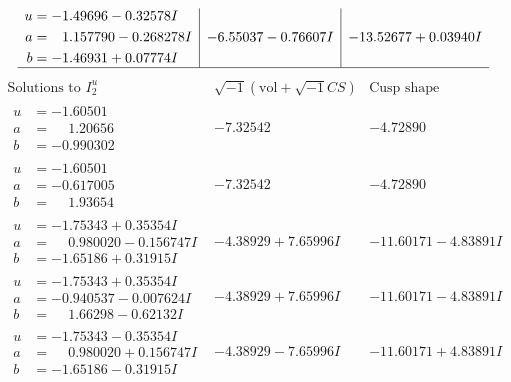 \documentclass[1p]{elsarticle_modified}
\theoremstyle{definition}
\newcommand{\I}{\sqrt{-1}}
\begin{document}
$$\begin{array}{c|c|c}
\begin{aligned}
u &= -1.49696 - 0.32578 I \\
a &= \phantom{-}1.157790 - 0.268278 I \\
b &= -1.46931 + 0.07774 I\end{aligned}
 & -6.55037 - 0.76607 I & -13.52677 + 0.03940 I\\
 \hline 
 \end{array}$$\newpage$$\begin{array}{c|c|c}  
\text{Solutions to }I^u_{2}& \I (\text{vol} + \sqrt{-1}CS) & \text{Cusp shape}\\
 \hline 
\begin{aligned}
u &= -1.60501\phantom{ +0.000000I} \\
a &= \phantom{-}1.20656\phantom{ +0.000000I} \\
b &= -0.990302\phantom{ +0.000000I}\end{aligned}
 & -7.32542\phantom{ +0.000000I} & -4.72890\phantom{ +0.000000I} \\ \hline\begin{aligned}
u &= -1.60501\phantom{ +0.000000I} \\
a &= -0.617005\phantom{ +0.000000I} \\
b &= \phantom{-}1.93654\phantom{ +0.000000I}\end{aligned}
 & -7.32542\phantom{ +0.000000I} & -4.72890\phantom{ +0.000000I} \\ \hline\begin{aligned}
u &= -1.75343 + 0.35354 I \\
a &= \phantom{-}0.980020 - 0.156747 I \\
b &= -1.65186 + 0.31915 I\end{aligned}
 & -4.38929 + 7.65996 I & -11.60171 - 4.83891 I \\ \hline\begin{aligned}
u &= -1.75343 + 0.35354 I \\
a &= -0.940537 - 0.007624 I \\
b &= \phantom{-}1.66298 - 0.62132 I\end{aligned}
 & -4.38929 + 7.65996 I & -11.60171 - 4.83891 I \\ \hline\begin{aligned}
u &= -1.75343 - 0.35354 I \\
a &= \phantom{-}0.980020 + 0.156747 I \\
b &= -1.65186 - 0.31915 I\end{aligned}
 & -4.38929 - 7.65996 I & -11.60171 + 4.83891 I \\ \hline\begin{aligned}

\end{aligned}
\end{array}$$
\end{document}
